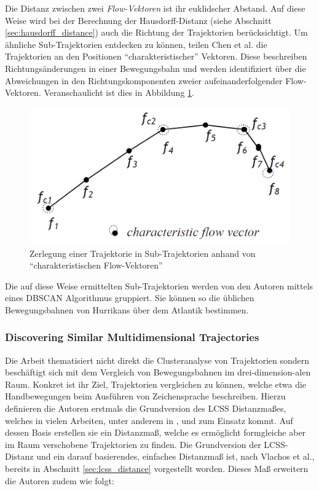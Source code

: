 Die Distanz zwischen zwei \textit{Flow-Vektoren} ist ihr euklidscher Abstand. Auf diese Weise wird bei
der Berechnung der Hausdorff-Distanz (siehe Abschnitt \ref{sec:hausdorff_distance}) auch die Richtung
der Trajektorien berücksichtigt.
Um ähnliche Sub-Trajektorien entdecken zu können, teilen Chen et al. die Trajektorien an den Positionen
``charakteristischer'' Vektoren. Diese beschreiben Richtungsänderungen in einer
Bewegungsbahn und werden identifiziert über die Abweichungen in den Richtungskomponenten zweier
aufeinanderfolgender Flow-Vektoren.
Veranschaulicht ist dies in Abbildung \ref{fig:relw_chen_flow_vector}.

\begin{figure}[H]
    \centering
    \includegraphics[width=0.45\linewidth]{resources/img/RelatedWork/Chen_trajectory_splitting}
    \caption[Zerlegung einer Trajektorie in Sub-Trajektorien (Chen et al.)]
            {Zerlegung einer Trajektorie in Sub-Trajektorien anhand von ``charakteristischen Flow-Vektoren'' \cite[]{Chen2011}}
    \label{fig:relw_chen_flow_vector}
\end{figure}

Die auf diese Weise ermittelten Sub-Trajektorien werden von den Autoren mittels eines DBSCAN Algorithmus gruppiert.
Sie können so die üblichen Bewegungsbahnen von Hurrikans über dem Atlantik bestimmen.


\subsubsection*{Discovering Similar Multidimensional Trajectories}
\label{sec:relw_vlachos}
Die Arbeit \cite[]{Vlachos2002} thematisiert nicht direkt die Clusteranalyse von Trajektorien sondern
beschäftigt sich mit dem Vergleich von Bewegungsbahnen im drei-dimension-alen Raum. Konkret ist ihr Ziel,
Trajektorien vergleichen zu können, welche etwa die Handbewegungen beim Ausführen von Zeichensprache beschreiben.
Hierzu definieren die Autoren erstmals die Grundversion des LCSS Distanzmaßes, welches in vielen Arbeiten,
unter anderem in \cite[]{Atev2006}, \cite[]{Buzan2004} und \cite[]{Chen2005} zum Einsatz kommt.
Auf dessen Basis erstellen sie ein Distanzmaß, welche es ermöglicht formgleiche aber im Raum verschobene Trajektorien zu finden.
Die Grundversion der LCSS-Distanz und ein darauf basierendes, einfaches Distanzmaß ist, nach Vlachos et al.,
bereits in Abschnitt \ref{sec:lcss_distance} vorgestellt worden.
Dieses Maß erweitern die Autoren zudem wie folgt:

